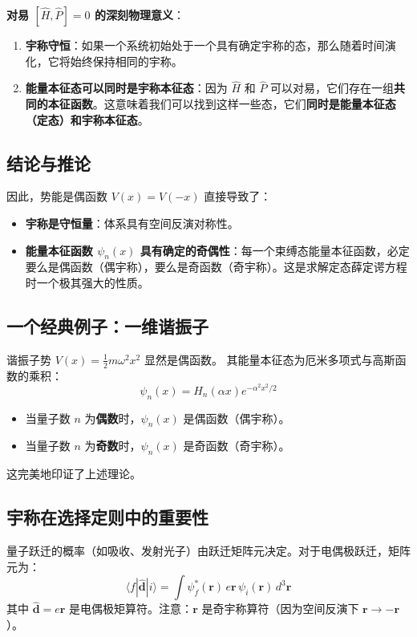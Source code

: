 \textbf{对易 $ [\hat{H}, \hat{P}] = 0 $ 的深刻物理意义}：
\begin{enumerate}
	\item \textbf{宇称守恒}：如果一个系统初始处于一个具有确定宇称的态，那么随着时间演化，它将始终保持相同的宇称。
	\item \textbf{能量本征态可以同时是宇称本征态}：因为 $ \hat{H} $ 和 $ \hat{P} $ 可以对易，它们存在一组\textbf{共同的本征函数}。这意味着我们可以找到这样一些态，它们\textbf{同时是能量本征态（定态）和宇称本征态}。
\end{enumerate}
\subsection{结论与推论}
因此，势能是偶函数 $ V(x)=V(-x) $ 直接导致了：
\begin{itemize}
	\item \textbf{宇称是守恒量}：体系具有空间反演对称性。
	\item \textbf{能量本征函数 $ \psi_n(x) $ 具有确定的奇偶性}：每一个束缚态能量本征函数，必定要么是偶函数（偶宇称），要么是奇函数（奇宇称）。这是求解定态薛定谔方程时一个极其强大的性质。
\end{itemize}

\subsection{一个经典例子：一维谐振子}
谐振子势 $ V(x) = \frac{1}{2} m\omega^2 x^2 $ 显然是偶函数。
其能量本征态为厄米多项式与高斯函数的乘积：
\[
\psi_n(x) = H_n(\alpha x) e^{-\alpha^2 x^2/2}
\]
\begin{itemize}
	\item 当量子数 $ n $ 为\textbf{偶数}时，$ \psi_n(x) $ 是偶函数（偶宇称）。
	\item 当量子数 $ n $ 为\textbf{奇数}时，$ \psi_n(x) $ 是奇函数（奇宇称）。
\end{itemize}
这完美地印证了上述理论。

\subsection{宇称在选择定则中的重要性}
量子跃迁的概率（如吸收、发射光子）由跃迁矩阵元决定。对于电偶极跃迁，矩阵元为：
\[
\langle f | \hat{\mathbf{d}} | i \rangle = \int \psi_f^* (\mathbf{r}) \, e\mathbf{r} \, \psi_i(\mathbf{r}) \, d^3\mathbf{r}
\]
其中 $\hat{\mathbf{d}} = e\mathbf{r}$ 是电偶极矩算符。注意：$\mathbf{r}$ 是奇宇称算符（因为空间反演下 $\mathbf{r} \rightarrow -\mathbf{r}$）。

